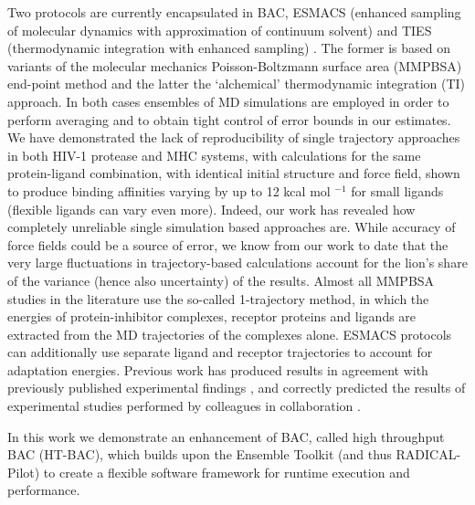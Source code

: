 Two protocols are currently encapsulated in BAC, ESMACS (enhanced sampling of molecular dynamics with approximation of continuum solvent) \cite{Wan2017brd4} and TIES (thermodynamic integration with enhanced sampling) \cite{Bhati2017}.
The former is based on variants of the molecular mechanics Poisson-Boltzmann surface area (MMPBSA) end-point method and the latter the `alchemical' thermodynamic integration (TI) approach.
In both cases ensembles of MD simulations are employed in order to perform averaging and to obtain tight control of error bounds in our estimates.
We have demonstrated the lack of reproducibility of single trajectory approaches in both HIV-1 protease and MHC systems, with calculations for the same protein-ligand combination, with identical initial structure and force field, shown to produce binding affinities varying by up to 12 kcal mol $^{-1}$ for small ligands (flexible ligands can vary even more). \cite{Wan2015, Sadiq2010, Wright2014}
Indeed, our work has revealed how completely unreliable single simulation based approaches are. 
While accuracy of force fields could be a source of error, we know from our work to date \cite{} that the very large fluctuations in trajectory-based calculations account for the lion’s share of the variance (hence also uncertainty) of the results.
Almost all MMPBSA studies in the literature use the so-called 1-trajectory method, in which the energies of protein-inhibitor complexes, receptor proteins and ligands are extracted from the MD trajectories of the complexes alone. 
ESMACS protocols can additionally use  separate ligand and receptor trajectories to account for adaptation energies. 
Previous work has produced results in agreement with previously published experimental findings \cite{Sadiq2010, Wan2011, Wright2014, Bhati2017, Wan2017brd4, Wan2017trk}, and correctly predicted the results of experimental studies performed by colleagues in collaboration \cite{Bunney2015}.

In this work we demonstrate an enhancement of BAC, called high throughput BAC (HT-BAC), which builds upon the Ensemble Toolkit (and thus RADICAL-Pilot) to create a flexible software framework for runtime execution and performance.
